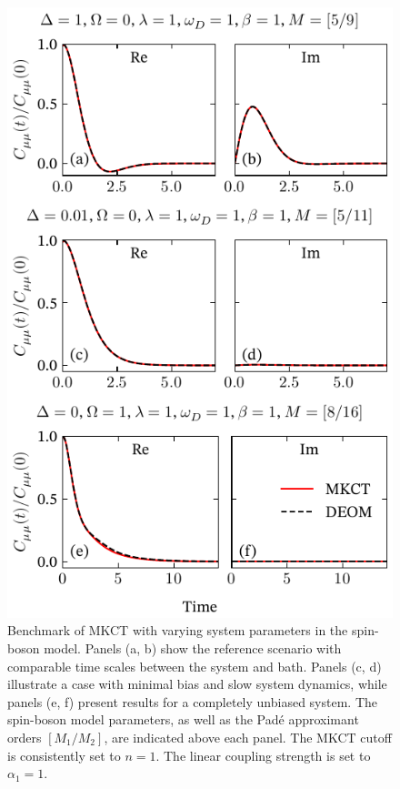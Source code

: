 \documentclass[preprint,aip,jcp]{revtex4-2}
\begin{document}
\begin{figure}[htbp]
    \centering
    \includegraphics[width=0.5\linewidth]{figs/system_parameters.pdf}
    \caption{Benchmark of MKCT with varying system parameters in the spin-boson model. Panels (a, b) show the reference scenario with comparable time scales between the system and bath. Panels (c, d) illustrate a case with minimal bias and slow system dynamics, while panels (e, f) present results for a completely unbiased system. The spin-boson model parameters, as well as the Pad\'{e} approximant orders $[M_1/M_2]$, are indicated above each panel. The MKCT cutoff is consistently set to $n=1$. The linear coupling strength is set to $\alpha_1 = 1$.}
    \label{fig:sys_param_roubust}
\end{figure}
\end{document}
